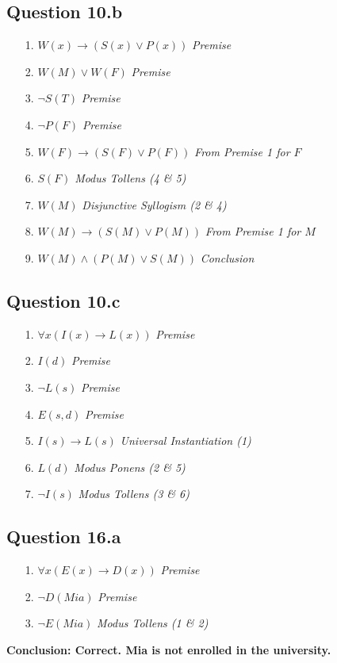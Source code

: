 \documentclass{article}
\begin{document}
\subsection*{Question 10.b}
\begin{itemize}
    \item[1.] \( W(x) \rightarrow (S(x) \lor P(x)) \) \hfill \textit{Premise}
    \item[2.] \( W(M) \lor W(F) \) \hfill \textit{Premise}
    \item[3.] \( \neg S(T) \) \hfill \textit{Premise}
    \item[4.] \( \neg P(F) \) \hfill \textit{Premise}
    \item[5.] \( W(F) \rightarrow (S(F) \lor P(F)) \) \hfill \textit{From Premise 1 for \( F \)}
    \item[6.] \( S(F) \) \hfill \textit{Modus Tollens (4 \& 5)}
    \item[7.] \( W(M) \) \hfill \textit{Disjunctive Syllogism (2 \& 4)}
    \item[8.] \( W(M) \rightarrow (S(M) \lor P(M)) \) \hfill \textit{From Premise 1 for \( M \)}
    \item[9.] \(W(M) \land (P(M) \lor S(M)) \) \hfill \textit{Conclusion}
\end{itemize}
\subsection*{Question 10.c}
\begin{itemize}
    \item[1.] \( \forall x (I(x) \rightarrow L(x)) \) \hfill \textit{Premise}
    \item[2.] \( I(d) \) \hfill \textit{Premise}
    \item[3.] \( \neg L(s) \) \hfill \textit{Premise}
    \item[4.] \( E(s, d) \) \hfill \textit{Premise}
    \item[5.] \( I(s) \rightarrow L(s) \) \hfill \textit{Universal Instantiation (1)}
    \item[6.] \( L(d) \) \hfill \textit{Modus Ponens (2 \& 5)}
    \item[7.] \( \neg I(s) \) \hfill \textit{Modus Tollens (3 \& 6)}
\end{itemize}

\subsection*{Question 16.a}
\begin{itemize}
    \item[1.] \( \forall x (E(x) \rightarrow D(x)) \) \hfill \textit{Premise}
    \item[2.] \( \neg D(Mia) \) \hfill \textit{Premise}
    \item[3.] \( \neg E(Mia) \) \hfill \textit{Modus Tollens (1 \& 2)}
\end{itemize}
\textbf{Conclusion: Correct. Mia is not enrolled in the university.}
\end{document}
